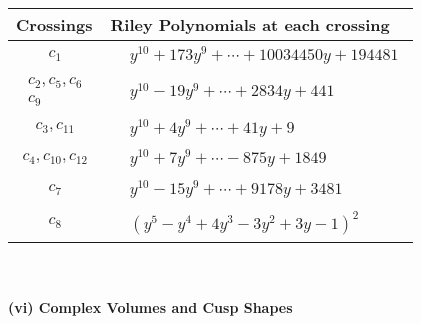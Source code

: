 \documentclass[1p]{elsarticle_modified}
\theoremstyle{definition}
\begin{document}
\begin{tabular}{m{50pt}|m{274pt}}
Crossings & \hspace{64pt}Riley Polynomials at each crossing \\
\hline $$\begin{aligned}c_{1}\end{aligned}$$&$\begin{aligned}
&y^{10}+173 y^9+\cdots+10034450 y+194481
\end{aligned}$\\
\hline $$\begin{aligned}c_{2},c_{5},c_{6}\\c_{9}\end{aligned}$$&$\begin{aligned}
&y^{10}-19 y^9+\cdots+2834 y+441
\end{aligned}$\\
\hline $$\begin{aligned}c_{3},c_{11}\end{aligned}$$&$\begin{aligned}
&y^{10}+4 y^9+\cdots+41 y+9
\end{aligned}$\\
\hline $$\begin{aligned}c_{4},c_{10},c_{12}\end{aligned}$$&$\begin{aligned}
&y^{10}+7 y^9+\cdots-875 y+1849
\end{aligned}$\\
\hline $$\begin{aligned}c_{7}\end{aligned}$$&$\begin{aligned}
&y^{10}-15 y^9+\cdots+9178 y+3481
\end{aligned}$\\
\hline $$\begin{aligned}c_{8}\end{aligned}$$&$\begin{aligned}
&(y^5- y^4+4 y^3-3 y^2+3 y-1)^2
\end{aligned}$\\
\hline
\end{tabular}\\~\\
\newpage\flushleft \textbf{(vi) Complex Volumes and Cusp Shapes}
\end{document}
